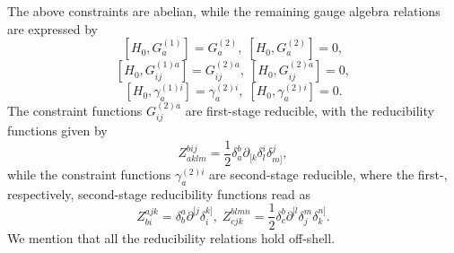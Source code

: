 \documentclass[a4paper,12pt]{article}
\begin{document}
The above constraints are abelian, while the remaining gauge algebra
relations are expressed by 
\begin{equation}
\left[ H_{0},G_{a}^{(1)}\right] =G_{a}^{(2)},\;\left[
H_{0},G_{a}^{(2)}\right] =0,  \label{xx11}
\end{equation}
\begin{equation}
\left[ H_{0},G_{ij}^{(1)a}\right] =G_{ij}^{(2)a},\;\left[
H_{0},G_{ij}^{(2)a}\right] =0,  \label{xx12}
\end{equation}
\begin{equation}
\left[ H_{0},\gamma _{a}^{(1)i}\right] =\gamma _{a}^{(2)i},\;\left[
H_{0},\gamma _{a}^{(2)i}\right] =0.  \label{xx13}
\end{equation}
The constraint functions $G_{ij}^{(2)a}$ are first-stage reducible, with the
reducibility functions given by 
\begin{equation}
Z_{aklm}^{bij}=\frac{1}{2}\delta _{a}^{b}\partial _{[k}\delta _{l}^{i}\delta
_{m]}^{j},  \label{xx14}
\end{equation}
while the constraint functions $\gamma _{a}^{(2)i}$ are second-stage
reducible, where the first-, respectively, second-stage reducibility
functions read as 
\begin{equation}
Z_{bi}^{ajk}=\delta _{b}^{a}\partial ^{[j}\delta _{i}^{k]},\;Z_{cjk}^{blmn}=%
\frac{1}{2}\delta _{c}^{b}\partial ^{[l}\delta _{j}^{m}\delta _{k}^{n]}.
\label{xx15}
\end{equation}
We mention that all the reducibility relations hold off-shell.
\end{document}
